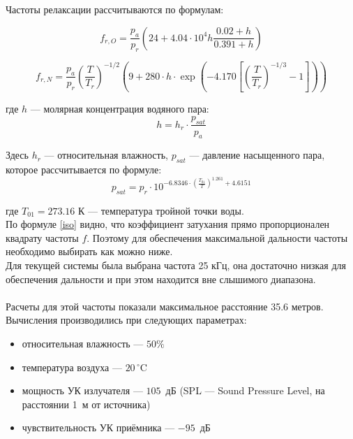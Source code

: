 \documentclass[a4paper,11pt]{article} %
\begin{document}
Частоты релаксации рассчитываются по формулам:

\begin{equation}
f_{r,O} = \frac{p_a}{p_r} \left( 24 + 4.04 \cdot 10^{4} h \frac{0.02 + h}{0.391 + h} \right)
\end{equation}

\begin{equation}
f_{r,N} = \frac{p_a}{p_r} \left( \frac{T}{T_r} \right)^{-1/2} \left( 9 + 280 \cdot h \cdot \exp \left( -4.170 \left[ \left(\frac{T}{T_r}\right)^{-1/3} - 1 \right] \right) \right)
\end{equation}

где $h$ — молярная концентрация водяного пара:
\begin{equation}
h = h_r \cdot \frac{p_{sat}}{p_a}
\end{equation}

Здесь $h_r$ — относительная влажность, $p_{sat}$ — давление насыщенного пара, которое рассчитывается по формуле:
\begin{equation}
p_{sat} = p_r \cdot 10^{-6.8346 \cdot \left( \frac{T_{01}}{T} \right)^{1.261} + 4.6151}
\end{equation}

где $T_{01} = 273.16$ К — температура тройной точки воды.
\\ 

По формуле \eqref{iso} видно, что коэффициент затухания прямо пропорционален квадрату частоты $f$.
Поэтому для обеспечения максимальной дальности частоты необходимо выбирать как можно ниже. \\

Для текущей системы была выбрана частота 25 кГц, она достаточно низкая для обеспечения дальности и при этом
находится вне слышимого диапазона.
\\
\\
Расчеты для этой частоты показали максимальное расстояние 35.6 метров.\\
Вычисления производились при следующих параметрах:
\begin{itemize}
\item относительная влажность --- $50\%$
\item температура воздуха --- $20\,^\circ\mathrm{C}$
\item мощность УК излучателя --- $105$~дБ (SPL --- Sound Pressure Level, на расстоянии 1~м от источника)
\item чувствительность УК приёмника --- $-95$~дБ
\end{itemize}
\end{document}
